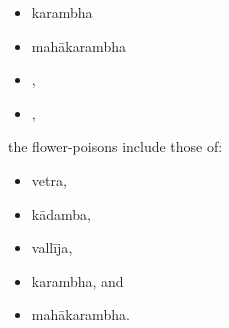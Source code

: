 \begin{translation}
\begin{itemize}
    \item \gls{karambha}
        
    \item \gls{mahākarambha}
    
    \item {},

    \item {},
        
        

\end{itemize}
    
        \item
        the flower-poisons include those of:
\begin{itemize}
            
        \item \gls{vetra},
        \item \gls{kādamba},        
        \item \gls{vallīja},
        \item \gls{karambha},
        and
        \item \gls{mahākarambha}.
        

\end{itemize}
\end{translation}
